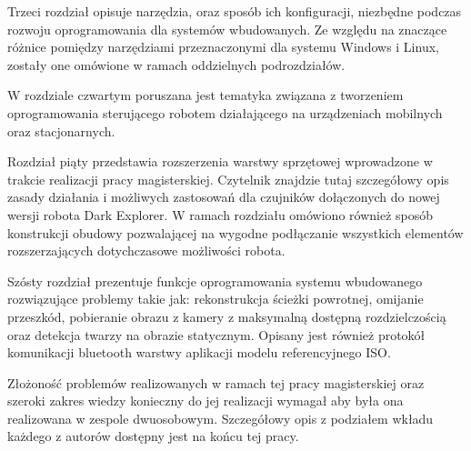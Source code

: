 Trzeci rozdział opisuje narzędzia, oraz sposób ich konfiguracji, niezbędne podczas rozwoju oprogramowania dla systemów wbudowanych. Ze względu na znaczące różnice pomiędzy narzędziami przeznaczonymi dla systemu Windows i Linux, zostały one omówione w ramach oddzielnych podrozdziałów. 

W rozdziale czwartym poruszana jest tematyka związana z tworzeniem oprogramowania sterującego robotem działającego na urządzeniach mobilnych oraz stacjonarnych. 

Rozdział piąty przedstawia rozszerzenia warstwy sprzętowej wprowadzone w trakcie realizacji pracy magisterskiej. Czytelnik znajdzie tutaj szczegółowy opis zasady działania i możliwych zastosowań dla czujników dołączonych do nowej wersji robota Dark Explorer. W ramach rozdziału omówiono również sposób konstrukcji obudowy pozwalającej na wygodne podłączanie wszystkich elementów rozszerzających dotychczasowe możliwości robota. 

Szósty rozdział prezentuje funkcje oprogramowania systemu wbudowanego rozwiązujące problemy takie jak: rekonstrukcja ścieżki powrotnej, omijanie przeszkód, pobieranie obrazu z kamery z maksymalną dostępną rozdzielczością oraz detekcja twarzy na obrazie statycznym. Opisany jest również protokół komunikacji bluetooth warstwy aplikacji modelu referencyjnego ISO.

Złożoność problemów realizowanych w ramach tej pracy magisterskiej oraz szeroki zakres wiedzy konieczny do jej realizacji wymagał aby była ona realizowana w zespole dwuosobowym. Szczegółowy opis z podziałem wkładu każdego z autorów dostępny jest na końcu tej pracy.